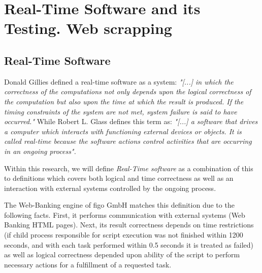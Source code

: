 \chapter{Real-Time Software and its Testing. Web scrapping}
\label{chap:rt}
\section{Real-Time Software}
Donald Gillies defined a real-time software as a system: \textit{"[...] in which the correctness of the computations not only depends upon the logical correctness of the computation but also upon the time at which the result is produced. If the timing constraints of the system are not met, system failure is said to have occurred."} While Robert L. Glass\cite{RealTimeTesting} defines this term as: \textit{"[...] a software that drives a computer which interacts with functioning external devices or objects. It is called real-time because the software actions control activities that are occurring in an ongoing process".} 

Within this research, we will define  \textit{Real-Time software} as a combination of this to definitions which covers both logical and time correctness as well as an interaction with external systems controlled by the ongoing process.

The Web-Banking engine of figo GmbH matches this definition due to the following facts. First, it performs communication with external systems (Web Banking HTML pages). Next, its result correctness depends on time restrictions (if child process responsible for script execution was not finished within 1200 seconds, and with each task performed within 0.5 seconds it is treated as failed) as well as logical correctness depended upon ability of the script to perform necessary actions for a fulfillment of a requested task.





